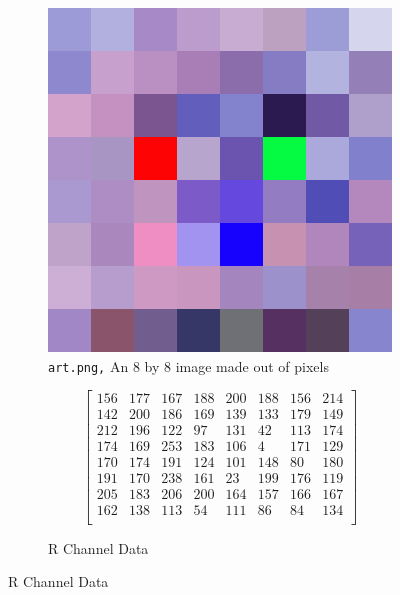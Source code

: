 \documentclass{article}
\begin{document}
\begin{figure}[h]
\tiny
\begin{subfigure}{0.5\textwidth}
\begin{center}
	\includegraphics[width=\linewidth]{./implementation/Photos/art upscaled.png}
\end{center}
\caption{\texttt{art.png,} An 8 by 8 image made out of pixels}
\end{subfigure}
\begin{subfigure}{0.5\textwidth}
\begin{equation*}
\begin{bmatrix}
	156 & 177 & 167 & 188 & 200 & 188 & 156 & 214 \\
	142 & 200 & 186 & 169 & 139 & 133 & 179 & 149 \\
	212 & 196 & 122 &  97 & 131 &  42 & 113 & 174 \\
	174 & 169 & 253 & 183 & 106 &   4 & 171 & 129 \\
	170 & 174 & 191 & 124 & 101 & 148 &  80 & 180 \\
	191 & 170 & 238 & 161 &  23 & 199 & 176 & 119 \\
	205 & 183 & 206 & 200 & 164 & 157 & 166 & 167 \\
	162 & 138 & 113 &  54 & 111 &  86 &  84 & 134 \\
\end{bmatrix}
\end{equation*}
\caption{R Channel Data}
\end{subfigure}


\end{figure}
\end{document}
